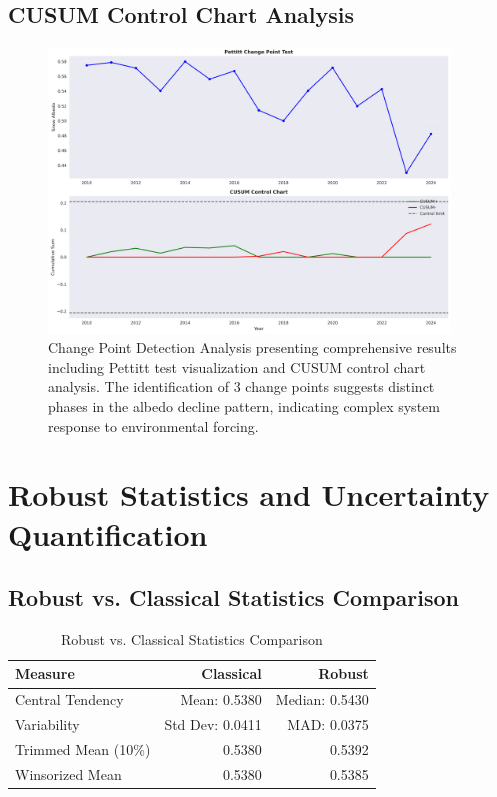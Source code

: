 \documentclass[12pt,a4paper]{article}
\begin{document}
\subsection{CUSUM Control Chart Analysis}

\begin{figure}[H]
\centering
\includegraphics[width=0.95\textwidth]{../../results/statistical_analysis/change_point_analysis.png}
\caption{Change Point Detection Analysis presenting comprehensive results including Pettitt test visualization and CUSUM control chart analysis. The identification of 3 change points suggests distinct phases in the albedo decline pattern, indicating complex system response to environmental forcing.}
\label{fig:change_point_analysis}
\end{figure}

\section{Robust Statistics and Uncertainty Quantification}

\subsection{Robust vs. Classical Statistics Comparison}

\begin{table}[H]
\centering
\caption{Robust vs. Classical Statistics Comparison}
\label{tab:robust_comparison}
\begin{tabular}{@{}lrr@{}}
\toprule
\textbf{Measure} & \textbf{Classical} & \textbf{Robust} \\
\midrule
Central Tendency & Mean: 0.5380 & Median: 0.5430 \\
Variability & Std Dev: 0.0411 & MAD: 0.0375 \\
Trimmed Mean (10\%) & 0.5380 & 0.5392 \\
Winsorized Mean & 0.5380 & 0.5385 \\
\bottomrule
\end{tabular}
\end{table}
\end{document}

